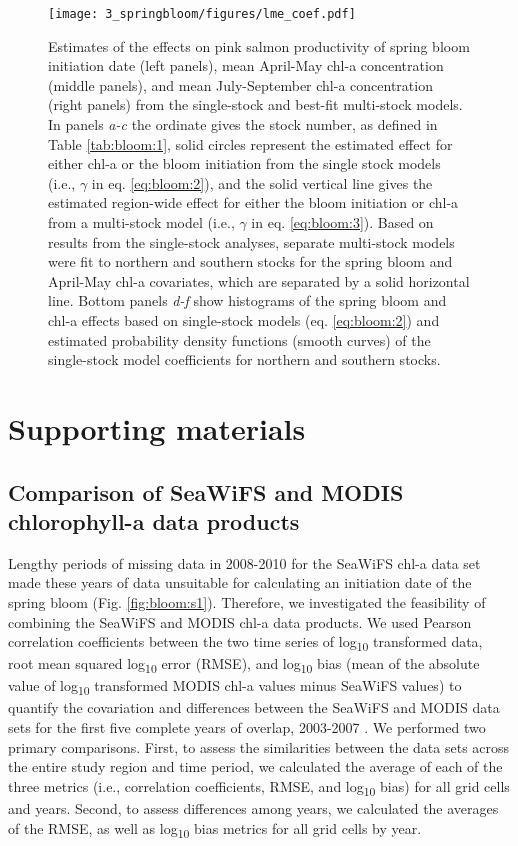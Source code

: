 \begin{figure}[htbp]
  \centering \texttt{[image: 3\_springbloom/figures/lme\_coef.pdf]}
  \caption{Estimates of the effects on pink salmon productivity of spring bloom
    initiation date (left panels), mean April-May chl-a concentration (middle
    panels), and mean July-September chl-a concentration (right panels) from the
    single-stock and best-fit multi-stock models. In panels \emph{a-c} the
    ordinate gives the stock number, as defined in Table \ref{tab:bloom:1}, solid circles
    represent the estimated effect for either chl-a or the bloom initiation from
    the single stock models (i.e., \(\gamma\) in eq. \ref{eq:bloom:2}), and the
    solid vertical line gives the estimated region-wide effect for either the
    bloom initiation or chl-a from a multi-stock model (i.e., \(\gamma\) in eq.
    \ref{eq:bloom:3}). Based on results from the single-stock analyses, separate
    multi-stock models were fit to northern and southern stocks for the spring
    bloom and April-May chl-a covariates, which are separated by a solid
    horizontal line. Bottom panels \emph{d-f} show histograms of the spring
    bloom and chl-a effects based on single-stock models (eq. \ref{eq:bloom:2})
    and estimated probability density functions (smooth curves) of the
    single-stock model coefficients for northern and southern stocks.}
  \label{fig:bloom:6}
\end{figure}


\newpage
\section{Supporting materials}

\subsection{Comparison of SeaWiFS and MODIS chlorophyll-a data products}
\label{supp:bloom:A}

Lengthy periods of missing data in 2008-2010 for the SeaWiFS chl-a data set made
these years of data unsuitable for calculating an initiation date of the spring
bloom (Fig. \ref{fig:bloom:s1}). Therefore, we investigated the feasibility of combining the
SeaWiFS and MODIS chl-a data products. We used Pearson correlation coefficients
between the two time series of log\textsubscript{10} transformed data, root mean
squared log\textsubscript{10} error (RMSE), and log\textsubscript{10} bias (mean
of the absolute value of log\textsubscript{10} transformed MODIS chl-a values
minus SeaWiFS values) to quantify the covariation and differences between the
SeaWiFS and MODIS data sets for the first five complete years of overlap,
2003-2007 \citep{Gregg2004, OReilly2000a, Zhang2006} . We performed two primary
comparisons. First, to assess the similarities between the data sets across the
entire study region and time period, we calculated the average of each of the
three metrics (i.e., correlation coefficients, RMSE, and log\textsubscript{10}
bias) for all grid cells and years. Second, to assess differences among years,
we calculated the averages of the RMSE, as well as log\textsubscript{10} bias
metrics for all grid cells by year.

